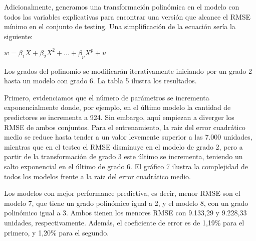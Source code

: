 \documentclass[11pt,oneside]{article}
\begin{document}
	Adicionalmente, generamos una transformación polinómica en el modelo con todos las variables explicativas para encontrar una versión que alcance el RMSE mínimo en el conjunto de testing. Una simplificación de la ecuación sería la siguiente:
	
	\begin{center}
		$w = \beta_{1}X + \beta_{2}X^2 + ... + \beta_{p}X^p + u$
	\end{center}
	
	Los grados del polinomio se modificarán iterativamente iniciando por un grado 2 hasta un modelo con grado 6. La tabla 5 ilustra los resultados.
	
	
	Primero, evidenciamos que el número de parámetros se incrementa exponencialmente donde, por ejemplo, en el último modelo la cantidad de predictores se incrementa a 924. Sin embargo, aquí empiezan a diverger los RMSE de ambos conjuntos. Para el entrenamiento, la raiz del error cuadrático medio se reduce hasta tender a un valor levemente superior a las 7.000 unidades, mientras que en el testeo el RMSE disminuye en el modelo de grado 2, pero a partir de la transformación de grado 3 este último se incrementa, teniendo un salto exponencial en el último de grado 6. %
	El gráfico 7 ilustra la complejidad de todos los modelos frente a la raiz del error cuadrático medio. 
	
	
	Los modelos con mejor performance predictiva, es decir, menor RMSE son el modelo 7, que tiene un grado polinómico igual a 2, y el modelo 8, con un grado polinómico igual a 3. Ambos tienen los menores RMSE con 9.133,29 y 9.228,33 unidades, respectivamente. Además, el coeficiente de error es de 1,19\% para el primero, y 1,20\% para el segundo. 
	
	
	
	\newpage
	
	
	
	
\end{document}
